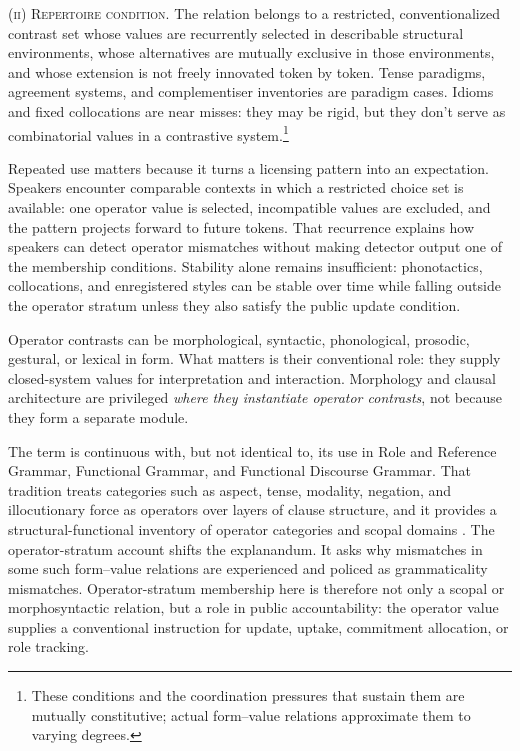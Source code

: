 \documentclass[12pt,letterpaper]{article}
\begin{document}
\textsc{(ii) Repertoire condition.} The relation belongs to a restricted, conventionalized contrast set whose values are recurrently selected in describable structural environments, whose alternatives are mutually exclusive in those environments, and whose extension is not freely innovated token by token. Tense paradigms, agreement systems, and complementiser inventories are paradigm cases. Idioms and fixed collocations are near misses: they may be rigid, but they don't serve as combinatorial values in a contrastive system.\footnote{These conditions and the coordination pressures that sustain them are mutually constitutive; actual form--value relations approximate them to varying degrees.}

Repeated use matters because it turns a licensing pattern into an expectation. Speakers encounter comparable contexts in which a restricted choice set is available: one operator value is selected, incompatible values are excluded, and the pattern projects forward to future tokens. That recurrence explains how speakers can detect operator mismatches without making detector output one of the membership conditions. Stability alone remains insufficient: phonotactics, collocations, and enregistered styles can be stable over time while falling outside the operator stratum unless they also satisfy the public update condition.

Operator contrasts can be morphological, syntactic, phonological, prosodic, gestural, or lexical in form. What matters is their conventional role: they supply closed-system values for interpretation and interaction. Morphology and clausal architecture are privileged \emph{where they instantiate operator contrasts}, not because they form a separate module.

The term  is continuous with, but not identical to, its use in Role and Reference Grammar, Functional Grammar, and Functional Discourse Grammar. That tradition treats categories such as aspect, tense, modality, negation, and illocutionary force as operators over layers of clause structure, and it provides a structural-functional inventory of operator categories and scopal domains \citep{hengeveld1989layers,vanvalinlapolla1997syntax,vanvalin2005interface,hengeveldmackenzie2008fdg,bentleyetal2023rrg}. The operator-stratum account shifts the explanandum. It asks why mismatches in some such form--value relations are experienced and policed as grammaticality mismatches. Operator-stratum membership here is therefore not only a scopal or morphosyntactic relation, but a role in public accountability: the operator value supplies a conventional instruction for update, uptake, commitment allocation, or role tracking.
\end{document}
